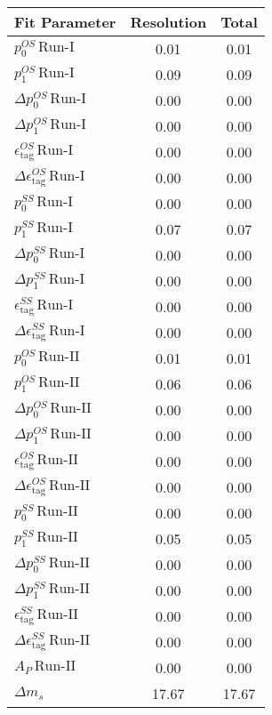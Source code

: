 \begin{tabular}{l  c  | c }
\hline
\hline
Fit Parameter & Resolution &  Total  \\ 
\hline
$p_{0}^{OS} \, \text{Run-I}$ & 0.01 & 0.01 \\ 
$p_{1}^{OS} \, \text{Run-I}$ & 0.09 & 0.09 \\ 
$\Delta p_{0}^{OS} \, \text{Run-I}$ & 0.00 & 0.00 \\ 
$\Delta p_{1}^{OS} \, \text{Run-I}$ & 0.00 & 0.00 \\ 
$\epsilon_{\text{tag}}^{OS} \, \text{Run-I}$ & 0.00 & 0.00 \\ 
$\Delta \epsilon_{\text{tag}}^{OS} \, \text{Run-I}$ & 0.00 & 0.00 \\ 
$p_{0}^{SS} \, \text{Run-I}$ & 0.00 & 0.00 \\ 
$p_{1}^{SS} \, \text{Run-I}$ & 0.07 & 0.07 \\ 
$\Delta p_{0}^{SS} \, \text{Run-I}$ & 0.00 & 0.00 \\ 
$\Delta p_{1}^{SS} \, \text{Run-I}$ & 0.00 & 0.00 \\ 
$\epsilon_{\text{tag}}^{SS} \, \text{Run-I}$ & 0.00 & 0.00 \\ 
$\Delta \epsilon_{\text{tag}}^{SS} \, \text{Run-I}$ & 0.00 & 0.00 \\ 
$p_{0}^{OS} \, \text{Run-II}$ & 0.01 & 0.01 \\ 
$p_{1}^{OS} \, \text{Run-II}$ & 0.06 & 0.06 \\ 
$\Delta p_{0}^{OS} \, \text{Run-II}$ & 0.00 & 0.00 \\ 
$\Delta p_{1}^{OS} \, \text{Run-II}$ & 0.00 & 0.00 \\ 
$\epsilon_{\text{tag}}^{OS} \, \text{Run-II}$ & 0.00 & 0.00 \\ 
$\Delta \epsilon_{\text{tag}}^{OS} \, \text{Run-II}$ & 0.00 & 0.00 \\ 
$p_{0}^{SS} \, \text{Run-II}$ & 0.00 & 0.00 \\ 
$p_{1}^{SS} \, \text{Run-II}$ & 0.05 & 0.05 \\ 
$\Delta p_{0}^{SS} \, \text{Run-II}$ & 0.00 & 0.00 \\ 
$\Delta p_{1}^{SS} \, \text{Run-II}$ & 0.00 & 0.00 \\ 
$\epsilon_{\text{tag}}^{SS} \, \text{Run-II}$ & 0.00 & 0.00 \\ 
$\Delta \epsilon_{\text{tag}}^{SS} \, \text{Run-II}$ & 0.00 & 0.00 \\ 
$A_{P} \, \text{Run-II}$ & 0.00 & 0.00 \\ 
$\Delta m_{s}$ & 17.67 & 17.67 \\ 
\hline
\hline
\end{tabular}
